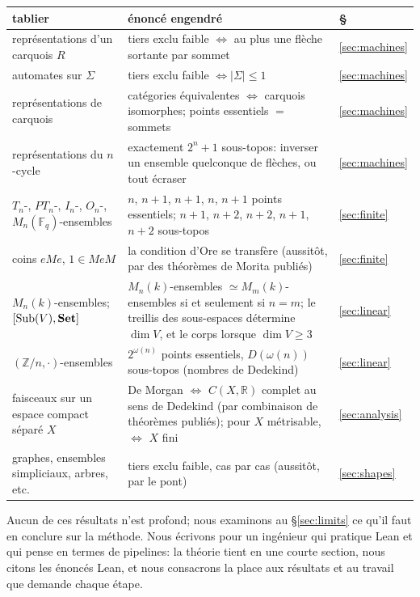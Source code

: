 \begin{center}\small
\begin{tabularx}{\linewidth}{>{\raggedright\arraybackslash}p{4.2cm}>{\raggedright\arraybackslash}X l}
\toprule
tablier & énoncé engendré & \S\\
\midrule
représentations d'un carquois $R$ & tiers exclu faible $\iff$ au plus une flèche sortante par sommet & \ref{sec:machines}\\
automates sur $\Sigma$ & tiers exclu faible $\iff|\Sigma|\le 1$ & \ref{sec:machines}\\
représentations de carquois & catégories équivalentes $\iff$ carquois isomorphes; points essentiels $=$ sommets & \ref{sec:machines}\\
représentations du $n$-cycle & exactement $2^n+1$ sous-topos: inverser un ensemble quelconque de flèches, ou tout écraser & \ref{sec:machines}\\
$T_n$-, $PT_n$-, $I_n$-, $O_n$-, $M_n(\mathbb F_q)$-ensembles & $n$, $n{+}1$, $n{+}1$, $n$, $n{+}1$ points essentiels; $n{+}1$, $n{+}2$, $n{+}2$, $n{+}1$, $n{+}2$ sous-topos & \ref{sec:finite}\\
coins $eMe$, $1\in MeM$ & la condition d'Ore se transfère (aussitôt, par des théorèmes de Morita publiés) & \ref{sec:finite}\\
$M_n(k)$-ensembles; $[\mathrm{Sub}(V),\mathbf{Set}]$ & $M_n(k)$-ensembles $\simeq M_m(k)$-ensembles si et seulement si $n = m$; le treillis des sous-espaces détermine $\dim V$, et le corps lorsque $\dim V\ge 3$ & \ref{sec:linear}\\
$(\mathbb Z/n,\cdot)$-ensembles & $2^{\omega(n)}$ points essentiels, $D(\omega(n))$ sous-topos (nombres de Dedekind) & \ref{sec:linear}\\
faisceaux sur un espace compact séparé $X$ & De Morgan $\iff$ $C(X,\mathbb R)$ complet au sens de Dedekind (par combinaison de théorèmes publiés); pour $X$ métrisable, $\iff$ $X$ fini & \ref{sec:analysis}\\
graphes, ensembles simpliciaux, arbres, etc. & tiers exclu faible, cas par cas (aussitôt, par le pont) & \ref{sec:shapes}\\
\bottomrule
\end{tabularx}
\end{center}

Aucun de ces résultats n'est profond; nous examinons au \S\ref{sec:limits} ce qu'il faut en conclure sur la méthode. Nous écrivons pour un ingénieur qui pratique Lean et qui pense en termes de pipelines: la théorie tient en une courte section, nous citons les énoncés Lean, et nous consacrons la place aux résultats et au travail que demande chaque étape.

